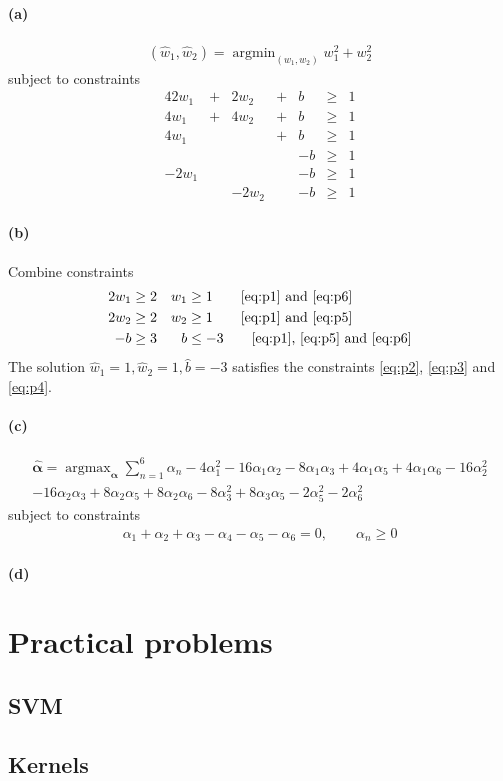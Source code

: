 \documentclass[a4paper,11pt]{article}
\DeclareMathOperator*{\argmax}{argmax}
\DeclareMathOperator*{\argmin}{argmin}
\begin{document}
\paragraph{(a)}
\begin{align*}
  (\hat{w}_1,\hat{w}_2)
  =\argmin_{(w_1,w_2)}w_1^2+w_2^2
\end{align*}
subject to constraints
\begin{alignat}{4}
  2w_1 &+& 2w_2 &+& b &\ge& 1\label{eq:p1}\\
  4w_1 &+& 4w_2 &+& b &\ge& 1\label{eq:p2}\\
  4w_1 & &      &+& b &\ge& 1\label{eq:p3}\\
       & &      & &-b &\ge& 1\label{eq:p4}\\
 -2w_1 & &      & &-b &\ge& 1\label{eq:p5}\\
       & &-2w_2 & &-b &\ge& 1\label{eq:p6}
\end{alignat}

\paragraph{(b)}
Combine constraints
\begin{align*}
  2w_1&\ge2 & w_1&\ge1 \tag*{\eqref{eq:p1} and \eqref{eq:p6}}\\
  2w_2&\ge2 & w_2&\ge1 \tag*{\eqref{eq:p1} and \eqref{eq:p5}}\\
    -b&\ge3 &   b&\le-3 \tag*{\eqref{eq:p1}, \eqref{eq:p5} and \eqref{eq:p6}}
\end{align*}
The solution $\hat{w}_1=1, \hat{w}_2=1, \hat{b}=-3$ satisfies the constraints \eqref{eq:p2}, \eqref{eq:p3} and \eqref{eq:p4}.

\paragraph{(c)}
\begin{multline}
  \hat{\boldsymbol{\alpha}}=
  \argmax_{\boldsymbol{\alpha}}\sum_{n=1}^6\alpha_n
    -4\alpha_1^2
    -16\alpha_1\alpha_2
    -8\alpha_1\alpha_3
    +4\alpha_1\alpha_5
    +4\alpha_1\alpha_6
    -16\alpha_2^2\\
    -16\alpha_2\alpha_3
    +8\alpha_2\alpha_5
    +8\alpha_2\alpha_6
    -8\alpha_3^2
    +8\alpha_3\alpha_5
    -2\alpha_5^2
    -2\alpha_6^2\label{eq:dual}
\end{multline}
subject to constraints
\begin{align*}
\alpha_1+\alpha_2+\alpha_3-\alpha_4-\alpha_5-\alpha_6=0,\qquad\alpha_n\ge0
\end{align*}
\paragraph{(d)}
\section{Practical problems}
\subsection{SVM}

\subsection{Kernels}
\end{document}
